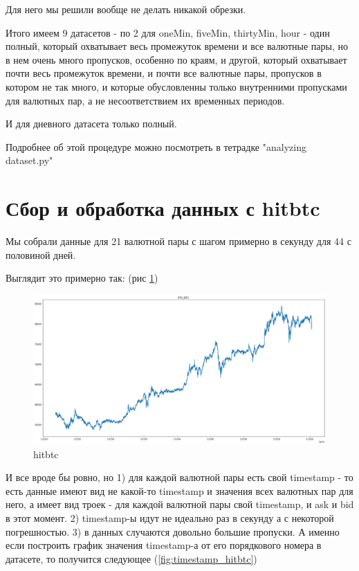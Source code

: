 \documentclass[11pt]{article}
\begin{document}
Для него мы решили вообще не делать никакой обрезки.

Итого имеем 9 датасетов - по 2 для oneMin, fiveMin, thirtyMin, hour - один полный, который охватывает весь промежуток времени и все валютные пары, но в нем очень много пропусков, особенно по краям,  и другой, который охватывает почти весь промежуток времени, и почти все валютные пары, пропусков в котором не так много, и которые обусловленны только внутренними пропусками для валютных пар, а не несоответствием их временных периодов.

И для дневного датасета только полный.

Подробнее об этой процедуре можно посмотреть в тетрадке "analyzing dataset.py"

\section{Сбор и обработка данных с hitbtc}
Мы собрали данные для 21 валютной пары с шагом примерно в секунду для 44 с половиной дней. 

Выглядит это примерно так: (рис \ref{fig:ETH_BTC_hitbtc})
 
\begin{figure}[!htb]
\includegraphics[width = 15cm]{ETH_BTC_hitbtc.png}
\caption{hitbtc}
\label{fig:ETH_BTC_hitbtc}
\end{figure} 

И все вроде бы ровно, но 1) для каждой валютной пары есть свой timestamp - то есть данные имеют вид не какой-то timestamp и значения всех валютных пар для него, а имеет вид троек - для каждой валютной пары свой timestamp, и ask и bid в этот момент. 2) timestamp-ы идут не идеально раз в секунду а с некоторой погрешностью. 3) в данных случаются довольно большие пропуски. А именно если построить график значения  timestamp-а от его порядкового номера в датасете, то получится следующее (\ref{fig:timestamp_hitbtc})
\end{document}
